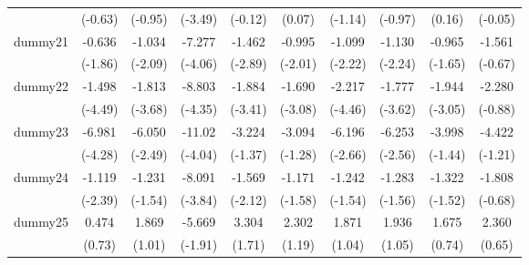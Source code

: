 {\begin{tabular}{l*{9}{c}}
            &     (-0.63)         &     (-0.95)         &     (-3.49)         &     (-0.12)         &      (0.07)         &     (-1.14)         &     (-0.97)         &      (0.16)         &     (-0.05)         \\
[1em]
dummy21     &      -0.636         &      -1.034\sym{*}  &      -7.277\sym{***}&      -1.462\sym{**} &      -0.995\sym{*}  &      -1.099\sym{*}  &      -1.130\sym{*}  &      -0.965         &      -1.561         \\
            &     (-1.86)         &     (-2.09)         &     (-4.06)         &     (-2.89)         &     (-2.01)         &     (-2.22)         &     (-2.24)         &     (-1.65)         &     (-0.67)         \\
[1em]
dummy22     &      -1.498\sym{***}&      -1.813\sym{***}&      -8.803\sym{***}&      -1.884\sym{***}&      -1.690\sym{**} &      -2.217\sym{***}&      -1.777\sym{***}&      -1.944\sym{**} &      -2.280         \\
            &     (-4.49)         &     (-3.68)         &     (-4.35)         &     (-3.41)         &     (-3.08)         &     (-4.46)         &     (-3.62)         &     (-3.05)         &     (-0.88)         \\
[1em]
dummy23     &      -6.981\sym{***}&      -6.050\sym{*}  &      -11.02\sym{***}&      -3.224         &      -3.094         &      -6.196\sym{**} &      -6.253\sym{*}  &      -3.998         &      -4.422         \\
            &     (-4.28)         &     (-2.49)         &     (-4.04)         &     (-1.37)         &     (-1.28)         &     (-2.66)         &     (-2.56)         &     (-1.44)         &     (-1.21)         \\
[1em]
dummy24     &      -1.119\sym{*}  &      -1.231         &      -8.091\sym{***}&      -1.569\sym{*}  &      -1.171         &      -1.242         &      -1.283         &      -1.322         &      -1.808         \\
            &     (-2.39)         &     (-1.54)         &     (-3.84)         &     (-2.12)         &     (-1.58)         &     (-1.54)         &     (-1.56)         &     (-1.52)         &     (-0.68)         \\
[1em]
dummy25     &       0.474         &       1.869         &      -5.669         &       3.304         &       2.302         &       1.871         &       1.936         &       1.675         &       2.360         \\
            &      (0.73)         &      (1.01)         &     (-1.91)         &      (1.71)         &      (1.19)         &      (1.04)         &      (1.05)         &      (0.74)         &      (0.65)         \\

\end{tabular}}
